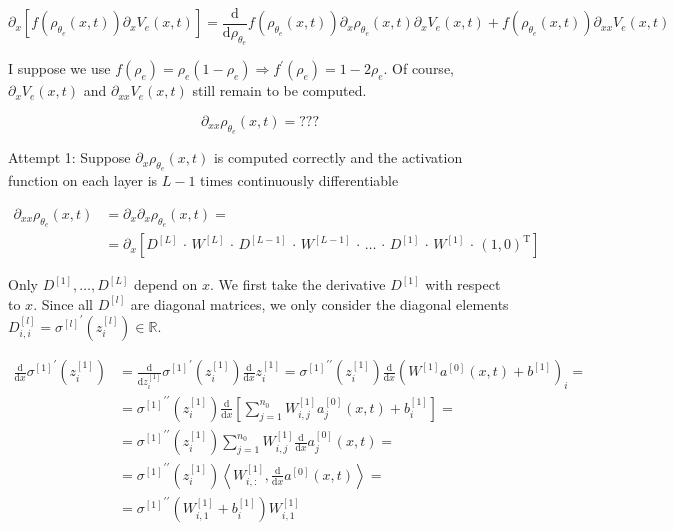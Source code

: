 \begin{equation*}
    \partial_x [f(\rho_{\theta_e}(x, t)) \partial_x V_e(x, t)] = \frac{\mathrm{d}}{\mathrm{d} \rho_{\theta_e}} f(\rho_{\theta_e}(x, t)) \partial_x \rho_{\theta_e}(x, t) \partial_x V_e(x, t) + f(\rho_{\theta_e}(x, t)) \partial_{xx} V_e(x, t)
\end{equation*}

I suppose we use $f(\rho_e) = \rho_e(1-\rho_e) \Rightarrow f^{\prime}(\rho_e) = 1 - 2 \rho_e$. Of course, $\partial_x V_e(x, t)$ and $\partial_{xx} V_e(x, t)$ still remain to be computed. 



\begin{equation*}
    \partial_{x x} \rho_{\theta_e}(x, t) = ???
\end{equation*}

Attempt 1: Suppose $\partial_x \rho_{\theta_e}(x, t)$ is computed correctly and the activation function on each layer is $L-1$ times continuously differentiable

\begin{align*}
    \partial_{x x} \rho_{\theta_e}(x, t) & = \partial_{x} \partial_{x} \rho_{\theta_e}(x, t) = \\
    & = \partial_{x} [D^{[L]} \, \cdot \, W^{[L]} \, \cdot \, D^{[L-1]} \, \cdot \, W^{[L-1]} \, \cdot \, \ldots \, \cdot \, D^{[1]} \, \cdot \, W^{[1]} \, \cdot \, (1, 0)^{\mathrm{T}}]
\end{align*}

Only $D^{[1]}, \ldots, D^{[L]}$ depend on $x$. We first take the derivative $D^{[1]}$ with respect to $x$. Since all $D^{[l]}$ are diagonal matrices, we only consider the diagonal elements $D_{i, i}^{[l]} = {\sigma^{[l]}}^{\prime} (z_{i}^{[l]}) \in \mathbb{R}$.  

\begin{align*}
    \frac{\mathrm{d}}{\mathrm{d} x} {\sigma^{[1]}}^{\prime} (z_{i}^{[1]}) & = \frac{\mathrm{d}}{\mathrm{d} z_{i}^{[1]}} {\sigma^{[1]}}^{\prime} (z_{i}^{[1]}) \frac{\mathrm{d}}{\mathrm{d} x} z_{i}^{[1]} = {\sigma^{[1]}}^{\prime \prime} (z_{i}^{[1]}) \frac{\mathrm{d}}{\mathrm{d} x} (W^{[1]} a^{[0]}(x,t) + b^{[1]})_i = \\
    & = {\sigma^{[1]}}^{\prime \prime} (z_{i}^{[1]}) \frac{\mathrm{d}}{\mathrm{d} x} \left[ \sum^{n_0}_{j=1} W^{[1]}_{i,j} a^{[0]}_{j}(x,t) + b^{[1]}_i \right] = \\
    & = {\sigma^{[1]}}^{\prime \prime} (z_{i}^{[1]}) \sum^{n_0}_{j=1} W^{[1]}_{i,j} \frac{\mathrm{d}}{\mathrm{d} x} a^{[0]}_{j}(x,t) = \\
    & = {\sigma^{[1]}}^{\prime \prime} (z_{i}^{[1]}) \left\langle W^{[1]}_{i, \colon}, \frac{\mathrm{d}}{\mathrm{d} x} a^{[0]}(x,t)  \right\rangle = \\
    & = {\sigma^{[1]}}^{\prime \prime} (W^{[1]}_{i, 1} + b^{[1]}_i) W^{[1]}_{i, 1}
\end{align*}


